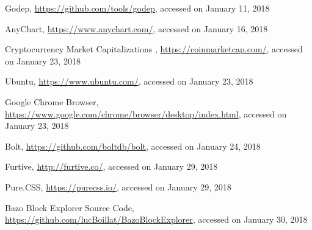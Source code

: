 \begin{thebibliography}{99}
 Godep, \url{https://github.com/tools/godep}, accessed on January 11, 2018

 AnyChart, \url{https://www.anychart.com/}, accessed on January 16, 2018

 Cryptocurrency Market Capitalizations , \url{https://coinmarketcap.com/}, accessed on January 23, 2018

 Ubuntu, \url{https://www.ubuntu.com/}, accessed on January 23, 2018

 Google Chrome Browser, \url{https://www.google.com/chrome/browser/desktop/index.html}, accessed on January 23, 2018

 Bolt, \url{https://github.com/boltdb/bolt}, accessed on January 24, 2018

 Furtive, \url{http://furtive.co/}, accessed on January 29, 2018

 Pure.CSS, \url{https://purecss.io/}, accessed on January 29, 2018

 Bazo Block Explorer Source Code, \url{https://github.com/lucBoillat/BazoBlockExplorer}, accessed on January 30, 2018

\end{thebibliography}

